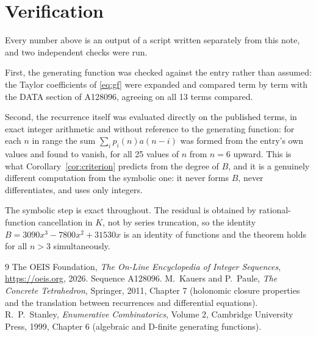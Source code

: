 \documentclass[11pt,a4paper]{article}
\theoremstyle{plain}
\theoremstyle{definition}
\begin{document}
\section{Verification}

Every number above is an output of a script written separately from this note, and two
independent checks were run.

First, the generating function was checked against the entry rather than assumed: the
Taylor coefficients of \eqref{eq:gf} were expanded and compared term by term with the DATA
section of A128096, agreeing on all 13 terms compared.

Second, the recurrence itself was evaluated directly on the published terms, in exact
integer arithmetic and without reference to the generating function: for each $n$ in range
the sum $\sum_{i}p_{i}(n)a(n-i)$ was formed from the entry's own values and found to
vanish, for all 25 values of $n$ from $n=6$ upward. This is what
Corollary~\ref{cor:criterion} predicts from the degree of $B$, and it is a genuinely
different computation from the symbolic one: it never forms $B$, never differentiates, and
uses only integers.

The symbolic step is exact throughout. The residual is obtained by rational-function
cancellation in $K$, not by series truncation, so the identity $B=3090 x^{3} - 7800 x^{2} + 31530 x$ is an
identity of functions and the theorem holds for all $n>3$ simultaneously.

\begin{thebibliography}{9}
 The OEIS Foundation, \emph{The On-Line Encyclopedia of Integer Sequences},
\url{https://oeis.org}, 2026. Sequence A128096.
 M.~Kauers and P.~Paule, \emph{The Concrete Tetrahedron}, Springer, 2011,
Chapter 7 (holonomic closure properties and the translation between recurrences and
differential equations).
 R.~P.~Stanley, \emph{Enumerative Combinatorics}, Volume 2, Cambridge
University Press, 1999, Chapter 6 (algebraic and D-finite generating functions).
\end{thebibliography}
\end{document}

